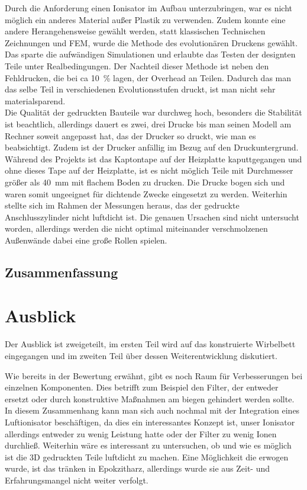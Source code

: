 Durch die Anforderung einen Ionisator im Aufbau unterzubringen, war es nicht möglich ein anderes Material außer Plastik zu verwenden. Zudem konnte eine andere Herangehensweise gewählt werden, statt klassischen Technischen Zeichnungen und FEM, wurde die Methode des evolutionären Druckens gewählt. Das sparte die aufwändigen Simulationen und erlaubte das Testen der designten Teile unter Realbedingungen. Der Nachteil dieser Methode ist neben den  Fehldrucken, die bei ca \SI{10}{\%} lagen, der Overhead an Teilen. Dadurch das man das selbe Teil in verschiedenen Evolutionsstufen druckt, ist man nicht sehr materialsparend. \\
Die Qualität der gedruckten Bauteile war durchweg hoch, besonders die Stabilität ist beachtlich, allerdings dauert es zwei, drei Drucke bis man seinen Modell am Rechner soweit angepasst hat, das der Drucker so druckt, wie man es beabsichtigt. Zudem ist der Drucker anfällig im Bezug auf den Druckuntergrund. Während des Projekts ist das Kaptontape auf der Heizplatte kaputtgegangen und ohne dieses Tape auf der Heizplatte, ist es nicht möglich Teile mit Durchmesser größer als \SI{40}{mm} mit flachem Boden zu drucken. Die Drucke bogen sich und waren somit ungeeignet für dichtende Zwecke eingesetzt zu werden. Weiterhin stellte sich im Rahmen der Messungen heraus, das der gedruckte Anschlusszylinder nicht luftdicht ist. Die genauen Ursachen sind nicht untersucht worden, allerdings werden die nicht optimal miteinander verschmolzenen Außenwände dabei eine große Rollen spielen.


\subsection{Zusammenfassung}








\section{Ausblick}

Der Ausblick ist zweigeteilt, im ersten Teil wird auf das konstruierte Wirbelbett eingegangen und im zweiten Teil über dessen Weiterentwicklung diskutiert. 

Wie bereits in der Bewertung erwähnt, gibt es noch Raum für Verbesserungen bei einzelnen Komponenten. Dies betrifft zum Beispiel den Filter, der entweder ersetzt oder durch konstruktive Maßnahmen am biegen gehindert werden sollte. In diesem Zusammenhang kann man sich auch nochmal mit der Integration eines Luftionisator beschäftigen, da dies ein interessantes Konzept ist, unser Ionisator allerdings entweder zu wenig Leistung hatte oder der Filter zu wenig Ionen durchließ.
Weiterhin wäre es interessant zu untersuchen, ob und wie es möglich ist die 3D gedruckten Teile luftdicht zu machen. Eine Möglichkeit die erwogen wurde, ist das tränken in Epokzitharz, allerdings wurde sie aus Zeit- und Erfahrungsmangel nicht weiter verfolgt.

